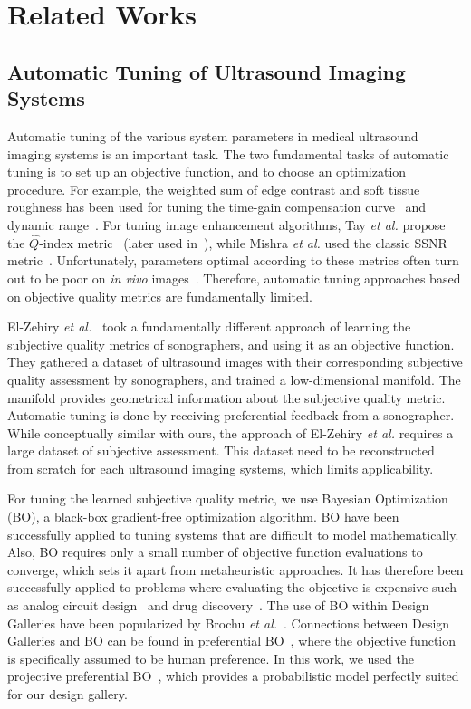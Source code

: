 
\section{Related Works}\label{section:relatedworks}
\subsection{Automatic Tuning of Ultrasound Imaging Systems}
Automatic tuning of the various system parameters in medical ultrasound imaging systems is an important task.
The two fundamental tasks of automatic tuning is to set up an objective function, and to choose an optimization procedure.
For example, the weighted sum of edge contrast and soft tissue roughness has been used for tuning the time-gain compensation curve~\cite{lee_automatic_2006} and dynamic range~\cite{lee_automatic_2015}.
For tuning image enhancement algorithms, Tay \textit{et al.} propose the \(\widehat{Q}\)-index metric~\cite{tay_ultrasound_2006} (later used in~\cite{coupe_nonlocal_2009, ramos-llorden_anisotropic_2015}), while Mishra \textit{et al.} used the classic SSNR metric~\cite{mishra_edge_2018}.
Unfortunately, parameters optimal according to these metrics often turn out to be poor on \textit{in vivo} images~\cite{ramos-llorden_anisotropic_2015}.
Therefore, automatic tuning approaches based on objective quality metrics are fundamentally limited.

El-Zehiry \textit{et al.}~\cite{el-zehiry_learning_2013} took a fundamentally different approach of learning the subjective quality metrics of sonographers, and using it as an objective function.
They gathered a dataset of ultrasound images with their corresponding subjective quality assessment by sonographers, and trained a low-dimensional manifold.
The manifold provides geometrical information about the subjective quality metric.
Automatic tuning is done by receiving preferential feedback from a sonographer.
While conceptually similar with ours, the approach of El-Zehiry \textit{et al.} requires a large dataset of subjective assessment.
This dataset need to be reconstructed from scratch for each ultrasound imaging systems, which limits applicability.

For tuning the learned subjective quality metric, we use Bayesian Optimization~\cite{shahriari_taking_2016} (BO), a black-box gradient-free optimization algorithm.
BO have been successfully applied to tuning systems that are difficult to model mathematically.
Also, BO requires only a small number of objective function evaluations to converge, which sets it apart from metaheuristic approaches.
It has therefore been successfully applied to problems where evaluating the objective is expensive such as analog circuit design~\cite{lyu_multiobjective_2018} and drug discovery~\cite{sano_application_2020}.
The use of BO within Design Galleries have been popularized by Brochu \textit{et al.}~\cite{NIPS2007_b6a1085a, brochu_bayesian_2010}.
Connections between Design Galleries and BO can be found in preferential BO~\cite{pmlr-v70-gonzalez17a}, where the objective function is specifically assumed to be human preference.
In this work, we used the projective preferential BO~\cite{pmlr-v119-mikkola20a}, which provides a probabilistic model perfectly suited for our design gallery.


